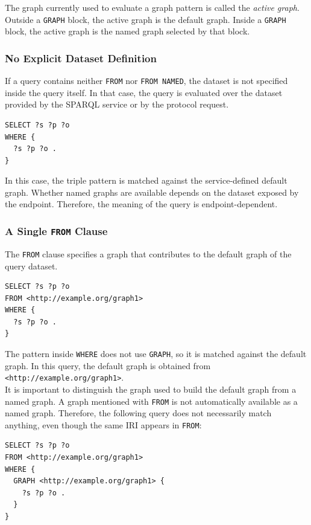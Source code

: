 \documentclass{scrbook}
\begin{document}
	The graph currently used to evaluate a graph pattern is called the \emph{active graph}. Outside a \texttt{GRAPH} block, the active graph is the default graph. Inside a \texttt{GRAPH} block, the active graph is the named graph selected by that block.
	
	\subsubsection{No Explicit Dataset Definition}
	
	If a query contains neither \texttt{FROM} nor \texttt{FROM NAMED}, the dataset is not specified inside the query itself. In that case, the query is evaluated over the dataset provided by the SPARQL service or by the protocol request.
	
	\begin{lstlisting}
SELECT ?s ?p ?o
WHERE {
  ?s ?p ?o .
}
	\end{lstlisting}
	
	In this case, the triple pattern is matched against the service-defined default graph. Whether named graphs are available depends on the dataset exposed by the endpoint. Therefore, the meaning of the query is endpoint-dependent.
	
	\subsubsection{A Single \texttt{FROM} Clause}
	
	The \texttt{FROM} clause specifies a graph that contributes to the default graph of the query dataset.
	
	\begin{lstlisting}
SELECT ?s ?p ?o
FROM <http://example.org/graph1>
WHERE {
  ?s ?p ?o .
}
	\end{lstlisting}
	
	The pattern inside \texttt{WHERE} does not use \texttt{GRAPH}, so it is matched against the default graph. In this query, the default graph is obtained from \texttt{<http://example.org/graph1>}.\\
	
	It is important to distinguish the graph used to build the default graph from a named graph. A graph mentioned with \texttt{FROM} is not automatically available as a named graph. Therefore, the following query does not necessarily match anything, even though the same IRI appears in \texttt{FROM}:
	
	\begin{lstlisting}
SELECT ?s ?p ?o
FROM <http://example.org/graph1>
WHERE {
  GRAPH <http://example.org/graph1> {
    ?s ?p ?o .
  }
}
	\end{lstlisting}
	
\end{document}
